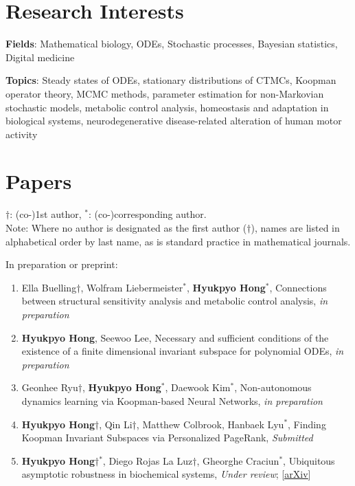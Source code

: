 \documentclass[margin,line]{res}
\newcommand{\vspacesection}{\vspace*{-1.5mm}}
\begin{document}
\begin{resume}
\section{\sc Research Interests}
\textbf{Fields}: Mathematical biology, ODEs, Stochastic processes, Bayesian statistics, Digital medicine

\vspace{-10pt}
\textbf{Topics}: Steady states of ODEs, stationary distributions of CTMCs, Koopman operator theory,
MCMC methods, parameter estimation for non-Markovian stochastic models,
metabolic control analysis, homeostasis and adaptation in biological systems,
neurodegenerative disease-related alteration of human motor activity
\vspacesection

\section{\sc Papers}
$\dagger$: (co-)1st author, ${}^*$: (co-)corresponding author. \\
Note: Where no author is designated as the first author ($\dagger$), names are listed in alphabetical order by last name, as is standard practice in mathematical journals.

\vspace{-5pt}
In preparation or preprint: \vspace{7pt}
\begin{enumerate}[leftmargin=*]
    \item Ella Buelling$\dagger$, Wolfram Liebermeister${}^*$, \textbf{Hyukpyo Hong}${}^*$, Connections between structural sensitivity analysis and metabolic control analysis, \textit{in preparation}

    \item \textbf{Hyukpyo Hong}, Seewoo Lee, Necessary and sufficient conditions of the existence of a finite dimensional invariant subspace for polynomial ODEs, \textit{in preparation}

    \item Geonhee Ryu$\dagger$, \textbf{Hyukpyo Hong}${}^*$, Daewook Kim${}^*$, Non-autonomous dynamics learning via Koopman-based Neural Networks, \textit{in preparation}

    \item \textbf{Hyukpyo Hong}$\dagger$, Qin Li$\dagger$, Matthew Colbrook, Hanbaek Lyu${}^*$, Finding Koopman Invariant Subspaces via Personalized PageRank, \textit{Submitted}

    \item \textbf{Hyukpyo Hong}$\dagger$${}^*$, Diego Rojas La Luz$\dagger$, Gheorghe Craciun${}^*$, Ubiquitous asymptotic robustness in biochemical systems, \textit{Under review}; [\href{https://doi.org/10.48550/arXiv.2505.21900}{\ul{arXiv}}]


\end{enumerate}
\end{resume}
\end{document}
